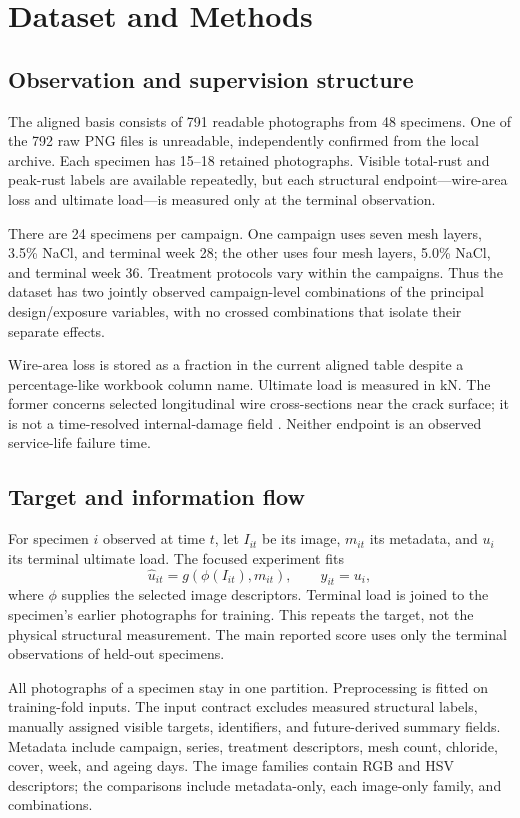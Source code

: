 \documentclass[conference]{IEEEtran}
\begin{document}
\section{Dataset and Methods}
\subsection{Observation and supervision structure}
The aligned basis consists of 791 readable photographs from 48 specimens. One of the 792 raw PNG files is unreadable, independently confirmed from the local archive. Each specimen has 15--18 retained photographs. Visible total-rust and peak-rust labels are available repeatedly, but each structural endpoint---wire-area loss and ultimate load---is measured only at the terminal observation.

There are 24 specimens per campaign. One campaign uses seven mesh layers, 3.5\% NaCl, and terminal week 28; the other uses four mesh layers, 5.0\% NaCl, and terminal week 36. Treatment protocols vary within the campaigns. Thus the dataset has two jointly observed campaign-level combinations of the principal design/exposure variables, with no crossed combinations that isolate their separate effects.

Wire-area loss is stored as a fraction in the current aligned table despite a percentage-like workbook column name. Ultimate load is measured in kN. The former concerns selected longitudinal wire cross-sections near the crack surface; it is not a time-resolved internal-damage field \cite{hossain_thesis}. Neither endpoint is an observed service-life failure time.

\subsection{Target and information flow}
For specimen $i$ observed at time $t$, let $I_{it}$ be its image, $m_{it}$ its metadata, and $u_i$ its terminal ultimate load. The focused experiment fits
\begin{equation}
\widehat u_{it}=g\left(\phi(I_{it}),m_{it}\right), \qquad y_{it}=u_i,
\label{eq:target}
\end{equation}
where $\phi$ supplies the selected image descriptors. Terminal load is joined to the specimen's earlier photographs for training. This repeats the target, not the physical structural measurement. The main reported score uses only the terminal observations of held-out specimens.

All photographs of a specimen stay in one partition. Preprocessing is fitted on training-fold inputs. The input contract excludes measured structural labels, manually assigned visible targets, identifiers, and future-derived summary fields. Metadata include campaign, series, treatment descriptors, mesh count, chloride, cover, week, and ageing days. The image families contain RGB and HSV descriptors; the comparisons include metadata-only, each image-only family, and combinations.
\end{document}
